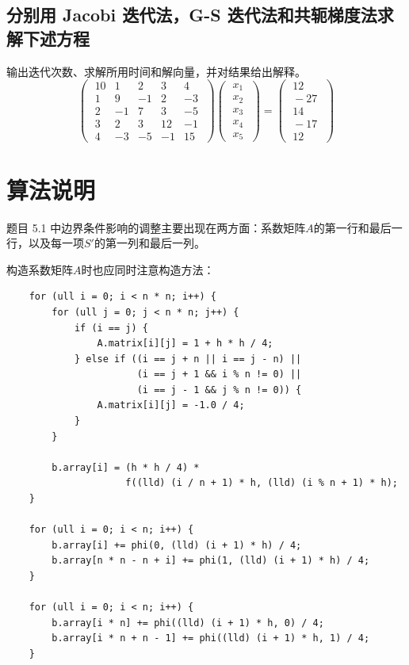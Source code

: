 \documentclass{article}
\begin{document}
\subsection{分别用 Jacobi 迭代法，G-S 迭代法和共轭梯度法求解下述方程}

输出迭代次数、求解所用时间和解向量，并对结果给出解释。
\[
\begin{pmatrix}
\;10 & 1 & 2 & 3 & 4 \;\\
\;1 & 9 & -1 & 2 & -3 \;\\
\;2 & -1 & 7 & 3 & -5 \;\\
\;3 & 2 & 3 & 12 & -1 \;\\
\;4 & -3 & -5 & -1 & 15\;
\end{pmatrix}
\begin{pmatrix}
\;x_1\;\\
\;x_2\;\\
\;x_3\;\\
\;x_4\;\\
\;x_5\;
\end{pmatrix}
=\begin{pmatrix}
\;12\;\\
\;-27\;\\
\;14\;\\
\;-17\;\\
\;12\;
\end{pmatrix}
\]

\section{算法说明}

题目 5.1 中边界条件影响的调整主要出现在两方面：系数矩阵$A$的第一行和最后一行，以及每一项$S'$的第一列和最后一列。

构造系数矩阵$A$时也应同时注意构造方法：

\begin{verbatim}
    for (ull i = 0; i < n * n; i++) {
        for (ull j = 0; j < n * n; j++) {
            if (i == j) {
                A.matrix[i][j] = 1 + h * h / 4;
            } else if ((i == j + n || i == j - n) ||
                       (i == j + 1 && i % n != 0) ||
                       (i == j - 1 && j % n != 0)) {
                A.matrix[i][j] = -1.0 / 4;
            }
        }

        b.array[i] = (h * h / 4) *
                     f((lld) (i / n + 1) * h, (lld) (i % n + 1) * h);
    }

    for (ull i = 0; i < n; i++) {
        b.array[i] += phi(0, (lld) (i + 1) * h) / 4;
        b.array[n * n - n + i] += phi(1, (lld) (i + 1) * h) / 4;
    }

    for (ull i = 0; i < n; i++) {
        b.array[i * n] += phi((lld) (i + 1) * h, 0) / 4;
        b.array[i * n + n - 1] += phi((lld) (i + 1) * h, 1) / 4;
    }
\end{verbatim}
\end{document}
